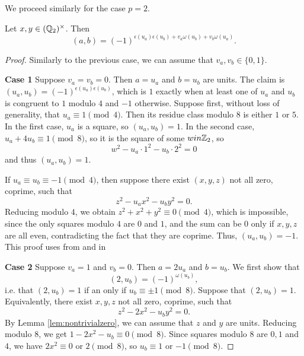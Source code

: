 We proceed similarly for the case $p = 2$.

\begin{theorem}
	\label{thm:padic_2}
	\leanok
Let $x,y \in (\mathbb{Q}_2)^\times$. Then
\[(a,b) = (-1)^{\epsilon(u_a)\epsilon(u_b) + v_a \omega(u_b) + v_b  \omega(u_a)}.\]
\end{theorem}

\begin{proof}
	Similarly to the previous case, we can assume that $v_a, v_b \in \{0, 1\}$.

	\noindent\textbf{Case 1} Suppose $v_a=v_b=0$. Then $a=u_a$ and $b=u_b$ are units. The claim is
		$(u_a,u_b)=(-1)^{\epsilon(u_a)\epsilon(u_b)}$, which is $1$ exactly when at least one of $u_a$
		and $u_b$ is congruent to $1$ modulo $4$ and $-1$ otherwise.
		Suppose first, without loss of generality, that $u_a \equiv 1 \pmod 4$. Then its residue class
		modulo $8$ is either $1$ or $5$. In the first case, $u_a$ is a square, so $(u_a,u_b)=1$. In the
		second case, $u_a+4u_b \equiv 1 \pmod 8$, so it is the square of some $w in \mathbb{Z}_2$, so
		\[
		w^2-u_a\cdot 1^2- u_b\cdot 2^2 = 0
		\]
		and thus $(u_a,u_b)=1$.

		If $u_a \equiv u_b \equiv -1 \pmod 4$, then suppose there exist $(x,y,z)$ not all zero, coprime,
		such that
		\[
		z^2-u_ax^2-u_by^2=0.
		\]
		Reducing modulo $4$, we obtain $z^2+x^2+y^2 \equiv 0 \pmod 4$, which is impossible, since the
		only squares modulo $4$ are $0$ and $1$, and the sum can be $0$ only if $x,y,z$ are all even,
		contradicting the fact that they are coprime. Thus, $(u_a,u_b)=-1$.
		This proof uses  from  and  in 

		\noindent\textbf{Case 2} Suppose $v_a=1$ and $v_b=0$. Then $a=2 u_a$ and $b=u_b$. We first show that
		\[
		(2, u_b) = (-1)^{\omega(u_b)},
		\]
		i.e. that $(2, u_b)=1$ if an only if $u_b \equiv \pm 1 \pmod 8$.
		Suppose that $(2, u_b)=1$. Equivalently, there exist $x,y,z$ not all zero, coprime, such that
		\[
		z^2-2x^2-u_by^2=0.
		\]
		By Lemma \ref{lem:nontrivialzero}, we can assume that $z$ and $y$ are units.
		Reducing modulo $8$, we get $1 - 2x^2 - u_b \equiv 0 \pmod 8$. Since squares modulo $8$ are
		$0, 1$ and $4$, we have $2x^2 \equiv 0$ or $2 \pmod 8$, so $u_b \equiv 1$ or $-1 \pmod 8$.


\end{proof}

